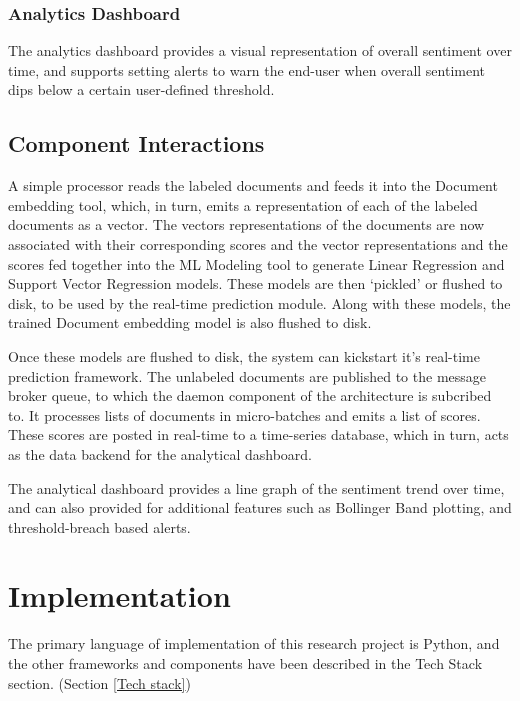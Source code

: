 \documentclass[conference]{IEEEtran}
\begin{document}
        \subsubsection{Analytics Dashboard}
            The analytics dashboard provides a visual representation of overall sentiment over time, and supports setting alerts to warn the end-user when overall sentiment dips below a certain user-defined threshold.

    \subsection{Component Interactions} \label{Component Interactions}
        A simple processor reads the labeled documents and feeds it into the Document embedding tool, which, in turn, emits a representation of each of the labeled documents as a vector.
        The vectors representations of the documents are now associated with their corresponding scores and the vector representations and the scores fed together into the ML Modeling tool to generate Linear Regression and Support Vector Regression models. 
        These models are then `pickled' or flushed to disk, to be used by the real-time prediction module. 
        Along with these models, the trained Document embedding model is also flushed to disk.

        Once these models are flushed to disk, the system can kickstart it's real-time prediction framework. 
        The unlabeled documents are published to the message broker queue, to which the daemon component of the architecture is subcribed to. 
        It processes lists of documents in micro-batches and emits a list of scores. 
        These scores are posted in real-time to a time-series database, which in turn, acts as the data backend for the analytical dashboard.

        The analytical dashboard provides a line graph of the sentiment trend over time, and can also provided for additional features such as Bollinger Band plotting, and threshold-breach based alerts.

\vspace{5mm}

\section{Implementation}

    The primary language of implementation of this research project is Python, and the other frameworks and components have been described in the Tech Stack section. (Section \ref{Tech stack})
\end{document}
